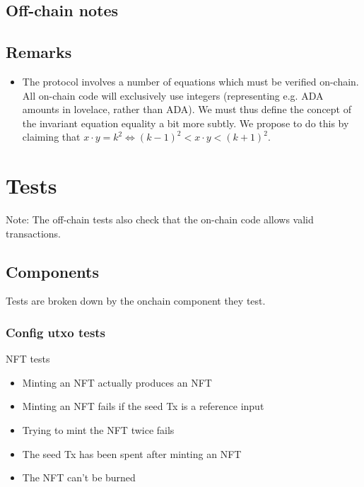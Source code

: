 \documentclass{article}
\begin{document}
\subsection{Off-chain notes}


\subsection{Remarks}

\begin{itemize}
  \item The protocol involves a number of equations which must be verified
    on-chain. All on-chain code will exclusively use integers (representing e.g.
    ADA amounts in lovelace, rather than ADA). We must thus define the concept
    of the invariant equation equality a bit more subtly. We propose to do this
    by claiming that $x \cdot y = k^2 \Leftrightarrow (k-1)^2 < x \cdot y <
    (k+1)^2$.
\end{itemize}


\section{Tests}


Note: The off-chain tests also check that the on-chain code allows valid
transactions.


\subsection{Components}

Tests are broken down by the onchain component they test.

\subsubsection{Config utxo tests}

NFT tests

\begin{itemize}
	\item Minting an NFT actually produces an NFT
	\item Minting an NFT fails if the seed Tx is a reference input
	\item Trying to mint the NFT twice fails
	\item The seed Tx has been spent after minting an NFT
	\item The NFT can't be burned
\end{itemize}
\end{document}
